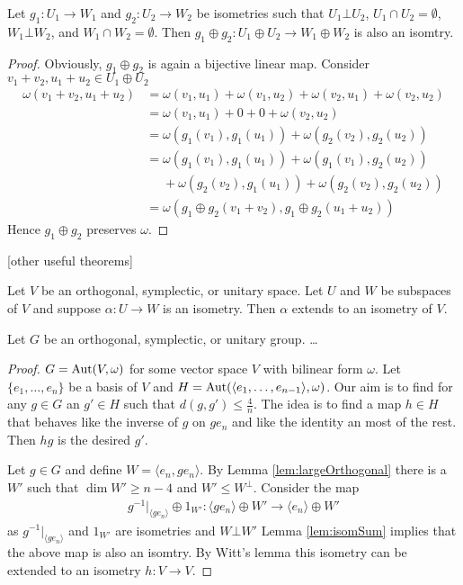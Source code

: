 \begin{lemma}\label{lem:isomSum}
Let $g_1\colon U_1\to W_1$ and $g_2\colon U_2\to W_2$ be isometries such that $U_1\bot U_2$, $U_1\cap U_2=\emptyset$, $W_1\bot W_2$, and $W_1\cap W_2=\emptyset$.
Then $g_1\oplus g_2\colon U_1\oplus U_2\to W_1\oplus W_2$ is also an isomtry.
\end{lemma}
\begin{proof}
Obviously, $g_1\oplus g_2$ is again a bijective linear map. Consider $v_1+v_2, u_1+u_2\in U_1\oplus U_2$
\begin{align*}
\omega(v_1+v_2, u_1+u_2)&=\omega(v_1, u_1)+\omega(v_1, u_2)+\omega(v_2, u_1)+\omega(v_2, u_2)\\
&=\omega(v_1, u_1)+0+0+\omega(v_2, u_2) \tag{$U_1\bot U_2$}\\
&=\omega(g_1(v_1), g_1(u_1))+\omega(g_2(v_2), g_2(u_2))\\
&=\omega(g_1(v_1), g_1(u_1))+\omega(g_1(v_1), g_2(u_2))\\ &\phantom{={}}+\omega(g_2(v_2), g_1(u_1))+\omega(g_2(v_2), g_2(u_2))\tag{$W_1\bot W_2$}\\
&=\omega(g_1\oplus g_2(v_1+v_2), g_1\oplus g_2(u_1+u_2))
\end{align*}
Hence $g_1\oplus g_2$ preserves $\omega$.
\end{proof}

[other useful theorems]


\begin{theorem}[Witt]
Let $V$ be an orthogonal, symplectic, or unitary space. Let $U$ and $W$ be subspaces of $V$ and suppose $\alpha\colon U\to W$ is an isometry. Then $\alpha$ extends to an isometry of $V$.
\end{theorem}

\begin{lemma}
Let $G$ be an orthogonal, symplectic, or unitary group. \dots
\end{lemma}
\begin{proof}
$G=\operatorname{Aut}(V,\omega)$ for some vector space $V$ with  bilinear form $\omega$. Let $\{e_1,\dots,e_n\}$ be a basis of $V$ and $H=\operatorname{Aut}(\langle e_1,\dots,e_{n-1}\rangle,\omega)$. Our aim is to find for any $g\in G$ an $g'\in H$ such that $d(g,g')\leq\frac{4}{n}$.
The idea is to find a map $h\in H$ that behaves like the inverse of $g$ on $ge_n$ and like the identity an most of the rest. Then $hg$ is the desired $g'$.

Let $g\in G$ and define $W=\langle e_n,ge_n\rangle$. By Lemma \ref{lem:largeOrthogonal} there is a $W'$ such that $\dim W'\geq n-4$ and $W'\leq W^\bot$. Consider the map
\begin{align*}
 g^{-1}|_{\langle ge_n\rangle}\oplus 1_{W'}\colon \langle ge_n\rangle\oplus W'\to \langle e_n\rangle\oplus W'
\end{align*}
as $g^{-1}|_{\langle ge_n\rangle}$ and $1_{W'}$ are isometries and $W\bot W'$ Lemma \ref{lem:isomSum} implies that the above map is also an isomtry. By Witt's lemma this isometry can be extended to an isometry $h\colon V\to V$.
\end{proof}